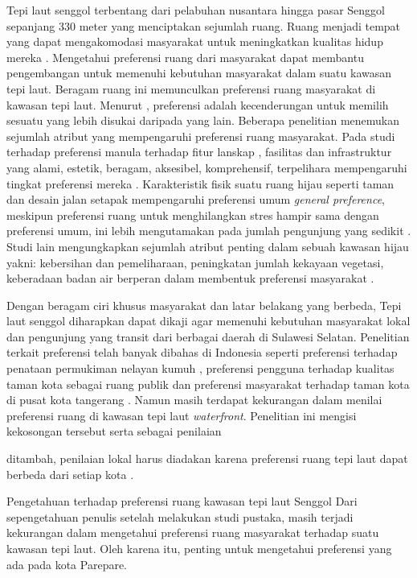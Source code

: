 \documentclass[../projects/thesis.tex]{subfiles}
\begin{document}
Tepi laut senggol terbentang dari pelabuhan nusantara hingga pasar Senggol sepanjang 330 meter yang menciptakan sejumlah ruang. Ruang menjadi tempat yang dapat mengakomodasi masyarakat untuk meningkatkan kualitas hidup mereka \citep{kim2012}. Mengetahui preferensi ruang dari masyarakat dapat membantu pengembangan untuk memenuhi kebutuhan masyarakat dalam suatu kawasan tepi laut.
Beragam ruang ini memunculkan preferensi ruang masyarakat di kawasan tepi laut. Menurut \cite{devysandra2012}, preferensi adalah kecenderungan untuk memilih sesuatu yang lebih disukai daripada yang lain.
Beberapa penelitian menemukan sejumlah atribut yang mempengaruhi preferensi ruang masyarakat. Pada studi terhadap preferensi manula terhadap fitur lanskap , fasilitas dan infrastruktur yang alami, estetik, beragam, aksesibel, komprehensif, terpelihara mempengaruhi tingkat preferensi mereka \citep{wen2018}. Karakteristik fisik suatu ruang hijau seperti taman dan desain jalan setapak mempengaruhi preferensi umum \textit{general preference}, meskipun preferensi ruang untuk menghilangkan stres hampir sama dengan preferensi umum, ini lebih mengutamakan pada jumlah pengunjung yang sedikit \citep{arnberger2015}. Studi lain mengungkapkan sejumlah atribut penting dalam sebuah kawasan hijau yakni: kebersihan dan pemeliharaan, peningkatan jumlah kekayaan vegetasi, keberadaan badan air berperan dalam membentuk preferensi masyarakat \citep{madureira2018}.

Dengan beragam ciri khusus masyarakat dan latar belakang yang berbeda, Tepi laut senggol diharapkan dapat dikaji agar memenuhi kebutuhan masyarakat lokal dan pengunjung yang transit dari berbagai daerah  di Sulawesi Selatan. Penelitian terkait preferensi telah banyak dibahas  di Indonesia seperti preferensi terhadap penataan permukiman nelayan kumuh \citep{ramdani2013}, preferensi pengguna terhadap kualitas taman kota sebagai ruang publik \citep{pratomo2017} dan  preferensi masyarakat terhadap taman kota di pusat kota tangerang \citep{imansari2015}. Namun masih terdapat kekurangan dalam menilai preferensi ruang di kawasan tepi laut \textit{waterfront}. Penelitian ini mengisi kekosongan tersebut serta sebagai penilaian

 ditambah, penilaian lokal harus diadakan karena preferensi ruang tepi laut dapat berbeda dari setiap kota \citep{madureira2018}.

Pengetahuan terhadap preferensi ruang kawasan tepi laut Senggol
Dari sepengetahuan penulis setelah melakukan studi pustaka, masih terjadi kekurangan dalam mengetahui preferensi ruang masyarakat terhadap suatu kawasan tepi laut.
Oleh karena itu, penting untuk mengetahui preferensi yang ada pada kota Parepare.
\end{document}
